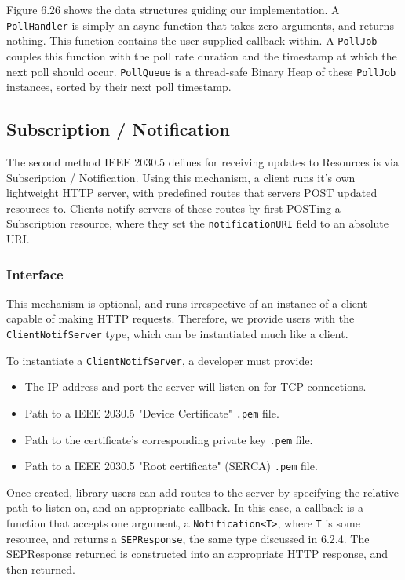 Figure 6.26 shows the data structures guiding our implementation. A \texttt{PollHandler} is simply an async function that takes zero arguments, and returns nothing. This function contains the user-supplied callback within. A \texttt{PollJob} couples this function with the poll rate duration and the timestamp at which the next poll should occur.
\texttt{PollQueue} is a thread-safe Binary Heap of these \texttt{PollJob} instances, sorted by their next poll timestamp.


\subsection{Subscription / Notification}
The second method IEEE 2030.5 defines for receiving updates to Resources is via Subscription / Notification.
Using this mechanism, a client runs it's own lightweight HTTP server, with predefined routes that servers POST updated resources to. Clients notify servers of these routes by first POSTing a Subscription resource, where they set the \texttt{notificationURI} field to an absolute URI.

\subsubsection{Interface}
This mechanism is optional, and runs irrespective of an instance of a client capable of making HTTP requests. Therefore, we provide users with the \texttt{ClientNotifServer} type, which can be instantiated much like a client.

To instantiate a \texttt{ClientNotifServer}, a developer must provide:

\begin{itemize}
    \item The IP address and port the server will listen on for TCP connections.
    \item Path to a IEEE 2030.5 "Device Certificate" \texttt{.pem} file.
    \item Path to the certificate's corresponding private key \texttt{.pem} file.
    \item Path to a IEEE 2030.5 "Root certificate" (SERCA) \texttt{.pem} file. 
\end{itemize}

Once created, library users can add routes to the server by specifying the relative path to listen on, and an appropriate callback. In this case, a callback is a function that accepts one argument, a \texttt{Notification<T>}, where \texttt{T} is some resource, and returns a \texttt{SEPResponse}, the same type discussed in 6.2.4. The SEPResponse returned is constructed into an appropriate HTTP response, and then returned.


